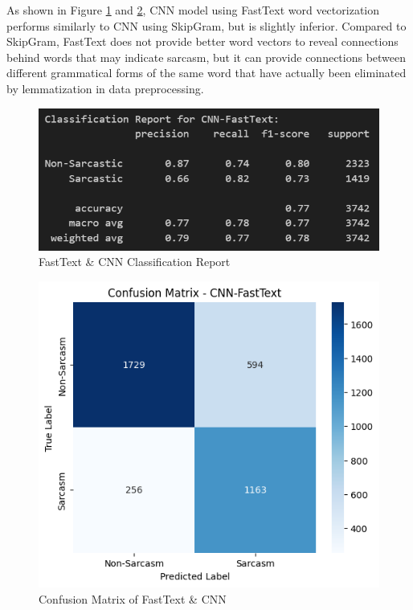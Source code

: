 \documentclass[11pt]{article}
\begin{document}
As shown in Figure \ref{fig:ftcnncr} and \ref{fig:ftcnncm}, CNN model using FastText word vectorization performs similarly to CNN using SkipGram, but is slightly inferior. Compared to SkipGram, FastText does not provide better word vectors to reveal connections behind words that may indicate sarcasm, but it can provide connections between different grammatical forms of the same word that have actually been eliminated by lemmatization in data preprocessing.
\begin{figure}[htbp]
    \centering
    \includegraphics[width=.8\linewidth]{pic/CNN-Fasttext-Report.png}
    \caption{FastText \& CNN Classification Report}
    \label{fig:ftcnncr}
\end{figure}
\begin{figure}[htbp]
    \centering
    \includegraphics[width=.8\linewidth]{pic/CNN-Fasttext-Matrix.png}
    \caption{Confusion Matrix of FastText \& CNN}
    \label{fig:ftcnncm}
\end{figure}
\end{document}
